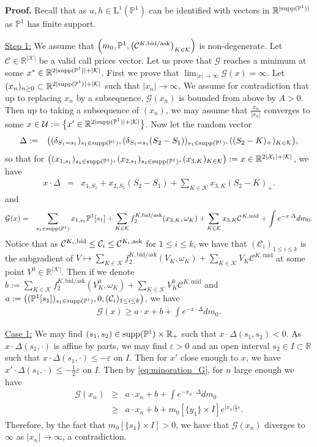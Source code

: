 \documentclass{amsart}%
\def\be{\begin{eqnarray}}
\def\ee{\end{eqnarray}}
\def\b*{\begin{eqnarray*}}
\def\e*{\end{eqnarray*}}
\def \P{{\mathbb P}}
\def \R{\mathbb{R}}
\def \eps{\varepsilon}
\def\Cc{{\cal C}}
\def\Gc{{\cal G}}
\def\Kc{{\cal K}}
\def\Uc{{\cal U}}
\def\no{\noindent}
\def\x{\times}
\def\eps{\varepsilon}
\def \proof{{\noindent \bf Proof. }}
\theoremstyle{definition}
\theoremstyle{remark}
\newcommand{\PP}{\mathbb{P}}
\newcommand{\X}{\mathcal{X}}
\newcommand{\cal}{\mathcal}
\newcommand{\LL}{{\mathrm L}}
\begin{document}
\proof
Recall that as $u,h\in \LL^1(\PP^1)$ can be identified with vectors in $\R^{|{\rm supp}(\P^1)|}$ as $\P^1$ has finite support.

\no\underline{\rm Step 1:} We assume that $\left(m_0, \P^1, \left(\Cc^{K,{\rm bid/ask}}\right)_{K\in\Kc}\right)$ is non-degenerate. Let $\Cc\in \R^{|\Kc|}$ be a valid call prices vector. Let us prove that $\Gc$ reaches a minimum at some $x^*\in \R^{2|{\rm supp}(\P^1)|+|\Kc|}$. First we prove that $\lim_{|x|\to\infty}\Gc(x) = \infty$. Let $(x_n)_{n\ge 0}\subset \R^{2|{\rm supp}(\P^1)|+|\Kc|}$ such that $|x_n|\longrightarrow\infty$. We assume for contradiction that up to replacing $x_n$ by a subsequence, $\Gc(x_n)$ is bounded from above by $A>0$. Then up to taking a subsequence of $(x_n)$, we may assume that $\frac{x_n}{|x_n|}$ converges to some $x\in \Uc:=\big\{x'\in\R^{2|{\rm supp}(\P^1)|+|\Kc|}\big\}$. Now let the random vector
\b*
\Delta &:=& \big((\delta_{S_1 = s_1})_{s_1\in{\rm supp}(\P^1)},(\delta_{S_1 = s_1}(S_2-S_1))_{s_1\in{\rm supp}(\P^1)},((S_2-K)_+)_{K\in\Kc}\big),
\e*
so that for $\big((x_{1, s_1})_{s_1\in{\rm supp}(\P^1)},(x_{2, s_1})_{s_1\in{\rm supp}(\P^1)}, (x_{3, K})_{K\in\Kc}\big):= x \in\R^{2|\X_1|+|\Kc|}$, we have
\b*
x\cdot\Delta &=& x_{1, S_1}+x_{2, S_1}(S_2-S_1)+\sum_{K\in\Kc}x_{3, K}(S_2-K)_+.
\e*
and
\b*
\Gc(x) &=& \sum_{s_1\in{\rm supp}(\P^1)}x_{1,s_1}\P^1[s_1] +\sum_{K \in {\cal K}}f_2^{K,\mathrm{bid}/\mathrm{ask}}(x_{3, K},\omega_K)+\sum_{K \in {\cal K}}  x_{3,K} \Cc^{K,\mathrm{mid}}+\int e^{-x\cdot \Delta}d{m_0}.
\e*
Notice that as $\Cc^{K_i,{\rm bid}}\le \Cc_i\le \Cc^{K_i,{\rm ask}}$ for $1\le i \le k$, we have that $(\Cc_i)_{1\le i \le k}$ is the subgradient of $V\longmapsto \sum_{K \in {\cal K}}f_2^{K,\mathrm{bid}/\mathrm{ask}}(V_K,\omega_K)+\sum_{K \in {\cal K}}  V_K \Cc^{K,\mathrm{mid}}$ at some point $V^0\in\R^{|\Kc|}$. Then if we denote $b:=\sum_{K \in {\cal K}}f_2^{K,\mathrm{bid}/\mathrm{ask}}(V^0_K,\omega_K)+\sum_{K \in {\cal K}}  V^0_K \Cc^{K,\mathrm{mid}}$ and $a:= \big((\P^1[s_1])_{s_1\in{\rm supp}(\P^1)},0,(\Cc_i)_{1\le i \le k}\big)$, we have
\be\label{eq:minoration_G}
\Gc(x)\ge a\cdot x+b+\int e^{-x\cdot \Delta}d{m_0}.
\ee

\no\underline{\rm Case 1:} We may find $(s_1,s_2)\in {\rm supp}(\P^1)\x\R_+$ such that $x\cdot \Delta(s_1,s_2)<0$. As $x\cdot \Delta(s_1,\cdot)$ is affine by parts, we may find $\eps >0$ and an open interval $s_2\in I\subset \R$ such that $x\cdot \Delta(s_1,\cdot)\le -\eps$ on $I$. Then for $x'$ close enough to $x$, we have $x'\cdot \Delta(s_1,\cdot)\le -\frac12\eps$ on $I$. Then by \eqref{eq:minoration_G}, for $n$ large enough we have
\b*
\Gc(x_n)&\ge& a\cdot x_n+b+\int e^{-x_n\cdot \Delta}d{m_0}\\
&\ge&a\cdot x_n+b+{m_0}[\{y_1\}\x I]e^{|x_n|\frac12\eps}.
\e*
Therefore, by the fact that ${m_0}[\{s_1\}\x I]>0$, we have that $\Gc(x_n)$ diverges to $\infty$ as $|x_n|\longrightarrow\infty$, a contradiction.
\end{document}

